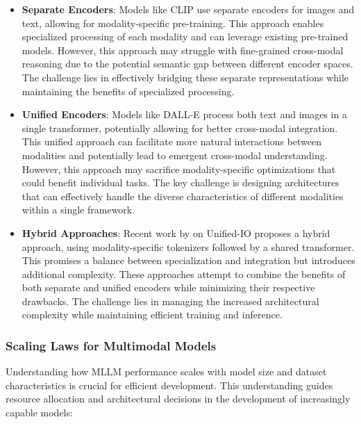 \begin{itemize}
    \item \textbf{Separate Encoders}: Models like CLIP \citep{radford2021learning} use separate encoders for images and text, allowing for modality-specific pre-training. This approach enables specialized processing of each modality and can leverage existing pre-trained models. However, this approach may struggle with fine-grained cross-modal reasoning due to the potential semantic gap between different encoder spaces. The challenge lies in effectively bridging these separate representations while maintaining the benefits of specialized processing.
    
    \item \textbf{Unified Encoders}: Models like DALL-E \citep{ramesh2021zero} process both text and images in a single transformer, potentially allowing for better cross-modal integration. This unified approach can facilitate more natural interactions between modalities and potentially lead to emergent cross-modal understanding. However, this approach may sacrifice modality-specific optimizations that could benefit individual tasks. The key challenge is designing architectures that can effectively handle the diverse characteristics of different modalities within a single framework.
    
    \item \textbf{Hybrid Approaches}: Recent work by \citet{lu2022unified} on Unified-IO proposes a hybrid approach, using modality-specific tokenizers followed by a shared transformer. This promises a balance between specialization and integration but introduces additional complexity. These approaches attempt to combine the benefits of both separate and unified encoders while minimizing their respective drawbacks. The challenge lies in managing the increased architectural complexity while maintaining efficient training and inference.
\end{itemize}

\subsubsection{Scaling Laws for Multimodal Models}
Understanding how MLLM performance scales with model size and dataset characteristics is crucial for efficient development. This understanding guides resource allocation and architectural decisions in the development of increasingly capable models:

